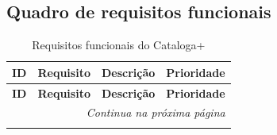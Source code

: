 
\begin{apendicesenv}
    
%     
%

\chapter{Quadro de requisitos funcionais}
\label{ape:rf}

\begin{longtable}{|p{}|p{}|p{}|p{}|}
    \caption{Requisitos funcionais do Cataloga+}
    \label{qua:rf} \\
    \hline
    \textbf{ID} & \textbf{Requisito} & \textbf{Descrição} & \textbf{Prioridade} \\ \hline
    \endfirsthead
    \hline
    \textbf{ID} & \textbf{Requisito} & \textbf{Descrição} & \textbf{Prioridade} \\ \hline
    \endhead
    \hline \multicolumn{4}{r}{\textit{Continua na próxima página}} \\
    \endfoot
    \hline
    \endlastfoot


\end{longtable}
\end{apendicesenv}
